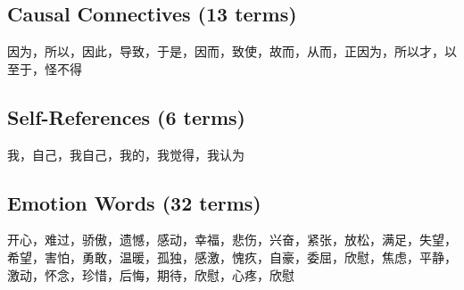 \documentclass[11pt]{article}
\begin{document}
\subsection{Causal Connectives (13 terms)}
因为，所以，因此，导致，于是，因而，致使，故而，从而，正因为，所以才，以至于，怪不得

\subsection{Self-References (6 terms)}
我，自己，我自己，我的，我觉得，我认为

\subsection{Emotion Words (32 terms)}
开心，难过，骄傲，遗憾，感动，幸福，悲伤，兴奋，紧张，放松，满足，失望，希望，害怕，勇敢，温暖，孤独，感激，愧疚，自豪，委屈，欣慰，焦虑，平静，激动，怀念，珍惜，后悔，期待，欣慰，心疼，欣慰
\end{document}
